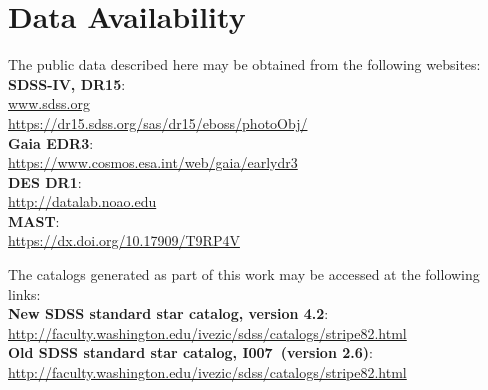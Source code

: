 \documentclass[fleqn,usenatbib]{mnras}
\newcommand{\pO}{\hbox{I007}}
\begin{document}



\section*{Data Availability \label{sec:DataAv}}

\noindent The public data described here may be obtained from the following websites: \\
{\bf SDSS-IV, DR15}:\\
\url{www.sdss.org}\\ 
\url{https://dr15.sdss.org/sas/dr15/eboss/photoObj/}\\
{\bf Gaia EDR3}:\\
\url{https://www.cosmos.esa.int/web/gaia/earlydr3}\\
{\bf DES DR1}:\\
\url{http://datalab.noao.edu}\\
{\bf MAST}:\\
\url{https://dx.doi.org/10.17909/T9RP4V}

\vspace{3mm}
\noindent The catalogs generated as part of this work may be accessed at the following links:\\
{\bf New SDSS standard star catalog, version 4.2}:\\
\url{http://faculty.washington.edu/ivezic/sdss/catalogs/stripe82.html}\\
{\bf Old SDSS standard star catalog, \pO\ (version 2.6)}:\\
\url{http://faculty.washington.edu/ivezic/sdss/catalogs/stripe82.html}\\

\end{document}
